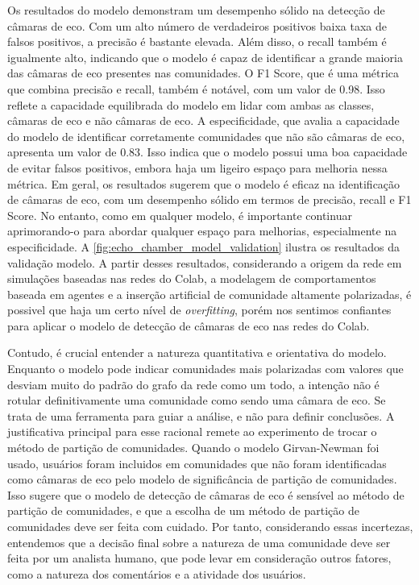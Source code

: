 Os resultados do modelo demonstram um desempenho sólido na detecção de câmaras de eco. Com um alto número de verdadeiros positivos baixa taxa de falsos positivos, a precisão é bastante elevada. Além disso, o recall também é igualmente alto, indicando que o modelo é capaz de identificar a grande maioria das câmaras de eco presentes nas comunidades. O F1 Score, que é uma métrica que combina precisão e recall, também é notável, com um valor de 0.98. Isso reflete a capacidade equilibrada do modelo em lidar com ambas as classes, câmaras de eco e não câmaras de eco. A especificidade, que avalia a capacidade do modelo de identificar corretamente comunidades que não são câmaras de eco, apresenta um valor de 0.83. Isso indica que o modelo possui uma boa capacidade de evitar falsos positivos, embora haja um ligeiro espaço para melhoria nessa métrica. Em geral, os resultados sugerem que o modelo é eficaz na identificação de câmaras de eco, com um desempenho sólido em termos de precisão, recall e F1 Score. No entanto, como em qualquer modelo, é importante continuar aprimorando-o para abordar qualquer espaço para melhorias, especialmente na especificidade. A \autoref{fig:echo_chamber_model_validation} ilustra os resultados da validação modelo. A partir desses resultados, considerando a origem da rede em simulações baseadas nas redes do Colab, a modelagem de comportamentos baseada em agentes e a inserção artificial de comunidade altamente polarizadas, é possivel que haja um certo nível de \textit{overfitting}, porém nos sentimos confiantes para aplicar o modelo de detecção de câmaras de eco nas redes do Colab.

Contudo, é crucial entender a natureza quantitativa e orientativa do modelo. Enquanto o modelo pode indicar comunidades mais polarizadas com valores que desviam muito do padrão do grafo da rede como um todo, a intenção não é rotular definitivamente uma comunidade como sendo uma câmara de eco. Se trata de uma ferramenta para guiar a análise, e não para definir conclusões. A justificativa principal para esse racional remete ao experimento de trocar o método de partição de comunidades. Quando o modelo Girvan-Newman foi usado, usuários foram incluidos em comunidades que não foram identificadas como câmaras de eco pelo modelo de significância de partição de comunidades. Isso sugere que o modelo de detecção de câmaras de eco é sensível ao método de partição de comunidades, e que a escolha de um método de partição de comunidades deve ser feita com cuidado. Por tanto, considerando essas incertezas, entendemos que a decisão final sobre a natureza de uma comunidade deve ser feita por um analista humano, que pode levar em consideração outros fatores, como a natureza dos comentários e a atividade dos usuários.

